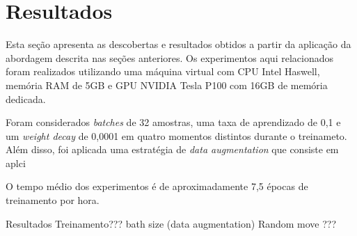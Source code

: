 \section{Resultados} %
\label{sec:resultados}

Esta seção apresenta as descobertas e resultados obtidos a partir da aplicação da abordagem descrita nas seções anteriores. Os experimentos aqui relacionados foram realizados utilizando uma máquina virtual com CPU Intel Haswell, memória RAM de 5GB e GPU NVIDIA Tesla P100 com 16GB de memória dedicada. 

Foram considerados \textit{batches} de 32 amostras, uma taxa de aprendizado de 0,1 e um \textit{weight decay} de 0,0001 em quatro momentos distintos durante o treinameto. Além disso, foi aplicada uma estratégia de \textit{data augmentation} que consiste em aplci

O tempo médio dos experimentos é de aproximadamente 7,5 épocas de treinamento por hora.

Resultados
Treinamento??? bath size
(data augmentation) Random move ???








